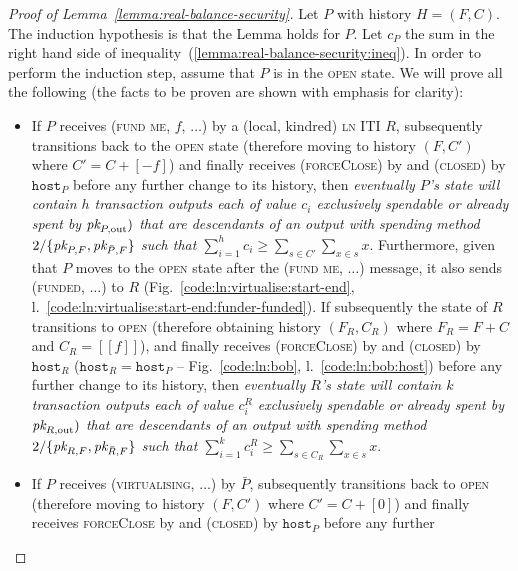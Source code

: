 \begin{proof}[Proof of Lemma~\ref{lemma:real-balance-security}]
  Let $P$ with history $H = (F, C)$. The induction hypothesis is that the Lemma
  holds for $P$. Let $c_P$ the sum in the right hand side of
  inequality~(\ref{lemma:real-balance-security:ineq}). In order to perform the
  induction step, assume that $P$ is in the \textsc{open} state. We will prove
  all the following (the facts to be proven are shown with emphasis for
  clarity):
  \begin{itemize}
    \item If $P$ receives (\textsc{fund me}, $f$, $\dots$) by a (local, kindred)
    \textsc{ln} ITI $R$, subsequently transitions back to the \textsc{open}
    state (therefore moving to history $(F, C')$ where $C' = C + [-f]$) and
    finally receives (\textsc{forceClose}) by \environment and (\textsc{closed}) by
    $\texttt{host}_P$ before any further change to its history, then
    \emph{eventually $P$'s \ledger state will contain $h$ transaction outputs
    each of value $c_i$ exclusively spendable or already spent by $\textit{pk}_{P,
    \mathrm{out}})$ that are descendants of an output with spending method
    $2/\{\textit{pk}_{P, F}, \textit{pk}_{\bar{P}, F}\}$ such that $\sum\limits_{i=1}^h c_i \geq
    \sum\limits_{s \in C'} \sum\limits_{x \in s} x$}. Furthermore, given that
    $P$ moves to the \textsc{open} state after the (\textsc{fund me}, $\dots$)
    message, it also sends (\textsc{funded}, $\dots$) to $R$
    (Fig.~\ref{code:ln:virtualise:start-end},
    l.~\ref{code:ln:virtualise:start-end:funder-funded}). If subsequently the
    state of $R$ transitions to \textsc{open} (therefore obtaining history
    $(F_R, C_R)$ where $F_R = F + C$ and $C_R = [[f]]$), and finally receives
    (\textsc{forceClose}) by \environment and (\textsc{closed}) by $\texttt{host}_R$
    ($\texttt{host}_R = \texttt{host}_P$ -- Fig.~\ref{code:ln:bob},
    l.~\ref{code:ln:bob:host}) before any further change to its history, then
    \emph{eventually $R$'s \ledger state will contain $k$ transaction outputs
    each of value $c^R_i$ exclusively spendable or already spent by $\textit{pk}_{R,
    \mathrm{out}})$ that are descendants of an output with spending method
    $2/\{\textit{pk}_{R, F}, \textit{pk}_{\bar{R}, F}\}$ such that $\sum\limits_{i=1}^k c^R_i \geq
    \sum\limits_{s \in C_R} \sum\limits_{x \in s} x$}.
    \item If $P$ receives (\textsc{virtualising}, $\dots$) by $\bar{P}$,
    subsequently transitions back to \textsc{open} (therefore moving to history
    $(F, C')$ where $C' = C + [0]$) and finally receives \textsc{forceClose} by
    \environment and (\textsc{closed}) by $\texttt{host}_P$ before any further

\end{itemize}
\end{proof}
